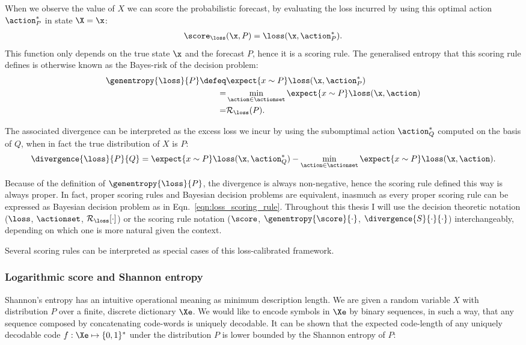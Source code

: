 When we observe the value of $X$ we can score the probabilistic forecast, by evaluating the loss incurred by using this optimal action $\action^{*}_{P}$ in state $\X=\x$:
%
\begin{align}
	\score_{\loss}(\x,P) = \loss(\x,\action^{*}_{P}).\label{eqn:loss_scoring_rule}
\end{align}
%
This function only depends on the true state $\x$ and the forecast $P$, hence it is a scoring rule. The generalised entropy that this scoring rule defines is otherwise known as the Bayes-risk of the decision problem:
%
\begin{align}
	\genentropy{\loss}{P} \defeq &\expect{x\sim P} \loss(\x,\action^{*}_{P})\\
		= &\min_{\action\in\actionset} \expect{x\sim P} \loss(\x,\action)\\
		= &\mathcal{R}_{\loss}(P).
\end{align}

The associated divergence can be interpreted as the excess loss we incur by using the subomptimal action $\action^{*}_{Q}$ computed on the basis of $Q$, when in fact the true distribution of $X$ is $P$:
%
\begin{align}
	\divergence{\loss}{P}{Q} = \expect{x\sim P} \loss(\x,\action^{*}_{Q}) - \min_{\action \in \actionset}\expect{x\sim P} \loss(\x,\action).
\end{align}

Because of the definition of $\genentropy{\loss}{P}$, the divergence is always non-negative, hence the scoring rule defined this way is always proper. In fact, proper scoring rules and Bayesian decision problems are equivalent, inasmuch as every proper scoring rule can be expressed as Bayesian decision problem as in Eqn.\ \eqref{eqn:loss_scoring_rule}. Throughout this thesis I will use the decision theoretic notation ($\loss$, $\actionset$, $\mathcal{R}_{\loss}[\cdot]$) or the scoring rule notation ($\score$, $\genentropy{\score}{\cdot}$, $\divergence{S}{\cdot}{\cdot}$) interchangeably, depending on which one is more natural given the context.

Several scoring rules can be interpreted as special cases of this loss-calibrated framework.

\subsubsection{Logarithmic score and Shannon entropy}

Shannon's entropy has an intuitive operational meaning as minimum description length. We are given a random variable $X$ with distribution $P$ over a finite, discrete dictionary $\Xe$. We would like to encode symbols in $\Xe$ by binary sequences, in such a way, that any sequence composed by concatenating code-words is uniquely decodable. It can be shown that the expected code-length of any uniquely decodable code $f:\Xe\mapsto\{0,1\}^{*}$ under the distribution $P$ is lower bounded by the Shannon entropy of $P$:

